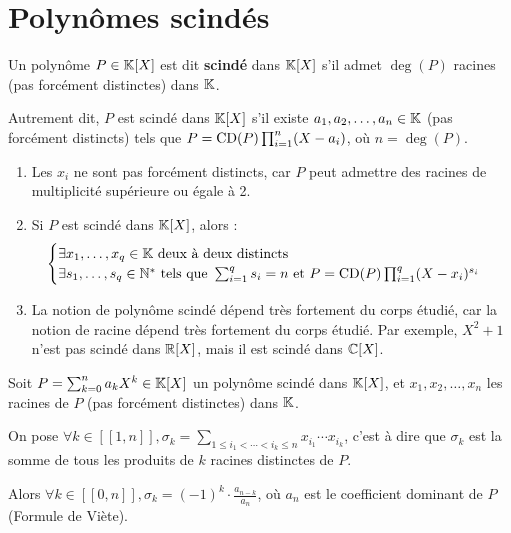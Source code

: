 \documentclass[12pt, a4paper]{report}
\begin{document}
\section{Polynômes scindés}

\begin{definition}
    Un polynôme $P \in \mathbb{K}[X]$ est dit \textbf{scindé} dans $\mathbb{K}[X]$ s'il admet $\deg(P)$ racines (pas forcément distinctes) dans $\mathbb{K}$.

    Autrement dit, $P$ est scindé dans $\mathbb{K}[X]$ s'il existe $a_1, a_2, \ldots, a_n \in \mathbb{K}$ (pas forcément distincts) tels que $P = \mathrm{CD}(P) \prod_{i=1}^{n}(X-a_i)$, où $n = \deg(P)$.
\end{definition}

\begin{remark}
    \begin{enumerate}
        \item Les $x_i$ ne sont pas forcément distincts, car $P$ peut admettre des racines de multiplicité supérieure ou égale à 2.
        \item Si $P$ est scindé dans $\mathbb{K}[X]$, alors :
        $$\begin{cases}
        \exists x_1,\dots,x_q \in \mathbb{K} \text{ deux à deux distincts }\\
        \exists s_1,\dots,s_q \in \mathbb{N}^* \text{ tels que } \sum_{i=1}^{q} s_i = n \text{ et } P = \mathrm{CD}(P) \prod_{i=1}^{q}(X-x_i)^{s_i}
        \end{cases}$$

        \item La notion de polynôme scindé dépend très fortement du corps étudié, car la notion de racine dépend très fortement du corps étudié. Par exemple, $X^2 + 1$ n'est pas scindé dans $\mathbb{R}[X]$, mais il est scindé dans $\mathbb{C}[X]$.
    \end{enumerate}
\end{remark}

\begin{property}
    Soit $P = \sum_{k=0}^{n}a_kX^k \in \mathbb{K}[X]$ un polynôme scindé dans $\mathbb{K}[X]$, et $x_1, x_2, \ldots, x_n$ les racines de $P$ (pas forcément distinctes) dans $\mathbb{K}$.

    On pose $\forall k \in [\![1,n]\!], \sigma_k = \sum_{1 \le i_1 < \cdots < i_k \le n} x_{i_1} \cdots x_{i_k}$, c'est à dire que $\sigma_k$ est la somme de tous les produits de $k$ racines distinctes de $P$.

    Alors $\forall k \in [\![0,n]\!], \sigma_k = (-1)^k \cdot \frac{a_{n-k}}{a_n}$, où $a_n$ est le coefficient dominant de $P$ (Formule de Viète).
\end{property}
\end{document}
